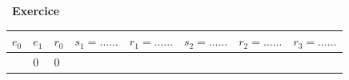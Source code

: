 \documentclass[
  11pt,
]{article}
\newcounter{exo}
\newenvironment{exercice}[1]
{\par \medskip   \addtocounter{exo}{1} \noindent  
\begin{bclogo}[arrondi =0.1,   noborder = true, logo=\bccrayon, marge=4]{~\textbf{Exercice} \textbf{\theexo} {\itshape #1} }  \par}
{
\end{bclogo}
 \par \bigskip }
\begin{document}
\begin{exercice}{}
\begin{longtable}[]{@{}clllllll@{}}
\toprule
\begin{minipage}[b]{0.05\columnwidth}\centering
\(e_{0}\)\strut
\end{minipage} & \begin{minipage}[b]{0.05\columnwidth}\raggedright
\(e_{1}\)\strut
\end{minipage} & \begin{minipage}[b]{0.05\columnwidth}\raggedright
\(r_{0}\)\strut
\end{minipage} & \begin{minipage}[b]{0.14\columnwidth}\raggedright
\(s_{1}=\ldots \ldots\)\strut
\end{minipage} & \begin{minipage}[b]{0.12\columnwidth}\raggedright
\(r_{1}=\ldots \ldots\)\strut
\end{minipage} & \begin{minipage}[b]{0.14\columnwidth}\raggedright
\(s_{2}=\ldots \ldots\)\strut
\end{minipage} & \begin{minipage}[b]{0.12\columnwidth}\raggedright
\(r_{2}=\ldots \ldots\)\strut
\end{minipage} & \begin{minipage}[b]{0.12\columnwidth}\raggedright
\(r_{3}=\ldots \ldots\)\strut
\end{minipage}\tabularnewline
\midrule
\endhead
\begin{minipage}[t]{0.05\columnwidth}\centering
0\strut
\end{minipage} & \begin{minipage}[t]{0.05\columnwidth}\raggedright
0\strut
\end{minipage} & \begin{minipage}[t]{0.05\columnwidth}\raggedright
0\strut
\end{minipage} & \begin{minipage}[t]{0.14\columnwidth}\raggedright
\strut
\end{minipage} & \begin{minipage}[t]{0.12\columnwidth}\raggedright
\strut
\end{minipage} & \begin{minipage}[t]{0.14\columnwidth}\raggedright
\strut
\end{minipage} & \begin{minipage}[t]{0.12\columnwidth}\raggedright
\strut
\end{minipage} & \begin{minipage}[t]{0.12\columnwidth}\raggedright

\end{minipage}
\end{longtable}
\end{exercice}
\end{document}
